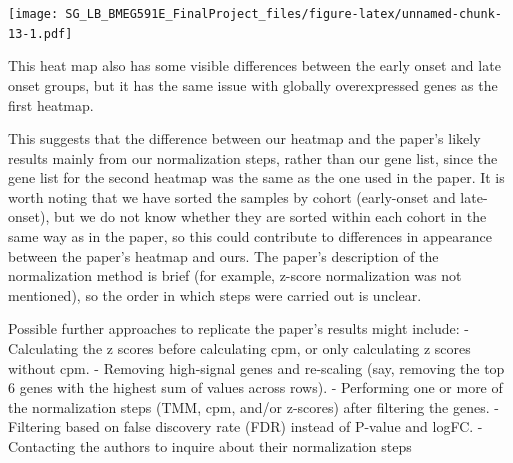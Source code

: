 \documentclass[
]{article}
\newenvironment{Shaded}{\begin{snugshade}}{\end{snugshade}}
\newcommand{\AttributeTok}[1]{\textcolor[rgb]{0.77,0.63,0.00}{#1}}
\newcommand{\CommentTok}[1]{\textcolor[rgb]{0.56,0.35,0.01}{\textit{#1}}}
\newcommand{\ConstantTok}[1]{\textcolor[rgb]{0.00,0.00,0.00}{#1}}
\newcommand{\FloatTok}[1]{\textcolor[rgb]{0.00,0.00,0.81}{#1}}
\newcommand{\FunctionTok}[1]{\textcolor[rgb]{0.00,0.00,0.00}{#1}}
\newcommand{\NormalTok}[1]{#1}
\newcommand{\OtherTok}[1]{\textcolor[rgb]{0.56,0.35,0.01}{#1}}
\newcommand{\SpecialCharTok}[1]{\textcolor[rgb]{0.00,0.00,0.00}{#1}}
\newcommand{\StringTok}[1]{\textcolor[rgb]{0.31,0.60,0.02}{#1}}
\begin{document}
\begin{Shaded}
\end{Shaded}

\texttt{[image: SG\_LB\_BMEG591E\_FinalProject\_files/figure-latex/unnamed-chunk-13-1.pdf]}

This heat map also has some visible differences between the early onset
and late onset groups, but it has the same issue with globally
overexpressed genes as the first heatmap.

This suggests that the difference between our heatmap and the paper's
likely results mainly from our normalization steps, rather than our gene
list, since the gene list for the second heatmap was the same as the one
used in the paper. It is worth noting that we have sorted the samples by
cohort (early-onset and late-onset), but we do not know whether they are
sorted within each cohort in the same way as in the paper, so this could
contribute to differences in appearance between the paper's heatmap and
ours. The paper's description of the normalization method is brief (for
example, z-score normalization was not mentioned), so the order in which
steps were carried out is unclear.

Possible further approaches to replicate the paper's results might
include: - Calculating the z scores before calculating cpm, or only
calculating z scores without cpm. - Removing high-signal genes and
re-scaling (say, removing the top 6 genes with the highest sum of values
across rows). - Performing one or more of the normalization steps (TMM,
cpm, and/or z-scores) after filtering the genes. - Filtering based on
false discovery rate (FDR) instead of P-value and logFC. - Contacting
the authors to inquire about their normalization steps
\end{document}
